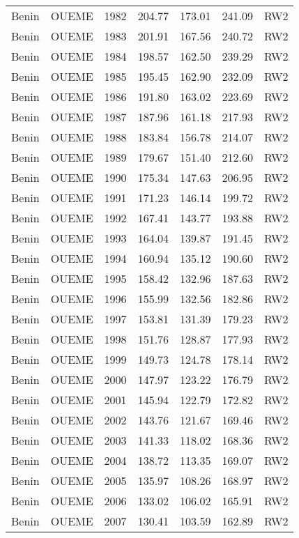 \begin{longtable}{lllrrrl}
  Benin & OUEME & 1982 & 204.77 & 173.01 & 241.09 & RW2 \\ 
  Benin & OUEME & 1983 & 201.91 & 167.56 & 240.72 & RW2 \\ 
  Benin & OUEME & 1984 & 198.57 & 162.50 & 239.29 & RW2 \\ 
  Benin & OUEME & 1985 & 195.45 & 162.90 & 232.09 & RW2 \\ 
  Benin & OUEME & 1986 & 191.80 & 163.02 & 223.69 & RW2 \\ 
  Benin & OUEME & 1987 & 187.96 & 161.18 & 217.93 & RW2 \\ 
  Benin & OUEME & 1988 & 183.84 & 156.78 & 214.07 & RW2 \\ 
  Benin & OUEME & 1989 & 179.67 & 151.40 & 212.60 & RW2 \\ 
  Benin & OUEME & 1990 & 175.34 & 147.63 & 206.95 & RW2 \\ 
  Benin & OUEME & 1991 & 171.23 & 146.14 & 199.72 & RW2 \\ 
  Benin & OUEME & 1992 & 167.41 & 143.77 & 193.88 & RW2 \\ 
  Benin & OUEME & 1993 & 164.04 & 139.87 & 191.45 & RW2 \\ 
  Benin & OUEME & 1994 & 160.94 & 135.12 & 190.60 & RW2 \\ 
  Benin & OUEME & 1995 & 158.42 & 132.96 & 187.63 & RW2 \\ 
  Benin & OUEME & 1996 & 155.99 & 132.56 & 182.86 & RW2 \\ 
  Benin & OUEME & 1997 & 153.81 & 131.39 & 179.23 & RW2 \\ 
  Benin & OUEME & 1998 & 151.76 & 128.87 & 177.93 & RW2 \\ 
  Benin & OUEME & 1999 & 149.73 & 124.78 & 178.14 & RW2 \\ 
  Benin & OUEME & 2000 & 147.97 & 123.22 & 176.79 & RW2 \\ 
  Benin & OUEME & 2001 & 145.94 & 122.79 & 172.82 & RW2 \\ 
  Benin & OUEME & 2002 & 143.76 & 121.67 & 169.46 & RW2 \\ 
  Benin & OUEME & 2003 & 141.33 & 118.02 & 168.36 & RW2 \\ 
  Benin & OUEME & 2004 & 138.72 & 113.35 & 169.07 & RW2 \\ 
  Benin & OUEME & 2005 & 135.97 & 108.26 & 168.97 & RW2 \\ 
  Benin & OUEME & 2006 & 133.02 & 106.02 & 165.91 & RW2 \\ 
  Benin & OUEME & 2007 & 130.41 & 103.59 & 162.89 & RW2 \\ 

\end{longtable}
